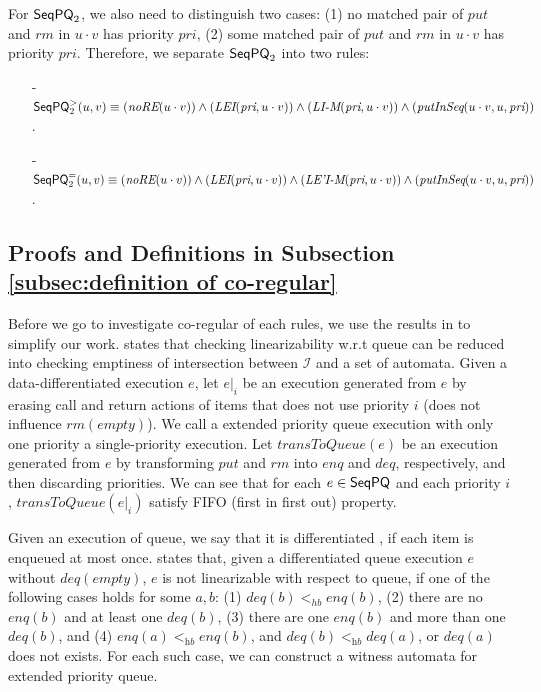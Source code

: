 For $\mathsf{SeqPQ}_2$, we also need to distinguish two cases: (1) no matched pair of $\textit{put}$ and $\textit{rm}$ in $u \cdot v$ has priority $\textit{pri}$, (2) some matched pair of $\textit{put}$ and $\textit{rm}$ in $u \cdot v$ has priority $\textit{pri}$. Therefore, we separate $\mathsf{SeqPQ}_2$ into two rules:

\begin{itemize}
\setlength{\itemsep}{0.5pt}
\item[-] $\mathsf{SeqPQ}_2^{>}(u,v) \equiv
(\textit{noRE}(u \cdot v)) \wedge
(\textit{LEI}(\textit{pri},u \cdot v)) \wedge
(\textit{LI-M}(\textit{pri},u \cdot v)) \wedge
(\textit{putInSeq}(u \cdot v,u,\textit{pri}))$.

\item[-] $\mathsf{SeqPQ}_2^{=}(u,v) \equiv
(\textit{noRE}(u \cdot v)) \wedge
(\textit{LEI}(\textit{pri},u \cdot v)) \wedge
(\textit{LE'I-M}(\textit{pri},u \cdot v)) \wedge
(\textit{putInSeq}(u \cdot v,u,\textit{pri}))$.
\end{itemize}


\subsection{Proofs and Definitions in Subsection \ref{subsec:definition of co-regular}}
\label{sec:appendix proof and definition in section definition of co-regular}

Before we go to investigate co-regular of each rules, we use the results in \cite{Bouajjani:2015} to simplify our work. \cite{Bouajjani:2015} states that checking linearizability w.r.t queue can be reduced into checking emptiness of intersection between $\mathcal{I}$ and a set of automata. Given a data-differentiated execution $e$, let $e \vert_{i}$ be an execution generated from $e$ by erasing call and return actions of items that does not use priority $i$ (does not influence $\textit{rm}(\textit{empty})$). We call a extended priority queue execution with only one priority a single-priority execution. Let $\textit{transToQueue}(e)$ be an execution generated from $e$ by transforming $\textit{put}$ and $\textit{rm}$ into $\textit{enq}$ and $\textit{deq}$, respectively, and then discarding priorities. We can see that for each $e \in \mathsf{SeqPQ}$ and each priority $i$, $\textit{transToQueue}(e \vert_{i})$ satisfy FIFO (first in first out) property.

Given an execution of queue, we say that it is differentiated \cite{Wolper:1986}, if each item is enqueued at most once. \cite{Bouajjani:2015} states that, given a differentiated queue execution $e$ without $\textit{deq}(\textit{empty})$, $e$ is not linearizable with respect to queue, if one of the following cases holds for some $a,b$: (1) $\textit{deq}(b) <_{hb} \textit{enq}(b)$, (2) there are no $\textit{enq}(b)$ and at least one $\textit{deq}(b)$, (3) there are one $\textit{enq}(b)$ and more than one $\textit{deq}(b)$, and (4) $\textit{enq}(a) <_{\textit{hb}} \textit{enq}(b)$, and $\textit{deq}(b) <_{\textit{hb}} \textit{deq}(a)$, or $\textit{deq}(a)$ does not exists. For each such case, we can construct a witness automata for extended priority queue.

